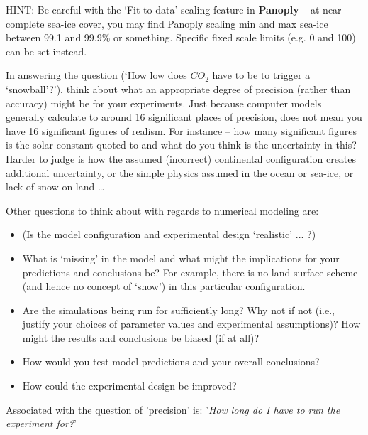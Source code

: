 HINT: Be careful with the ‘\textsf{\footnotesize Fit to data}’ scaling feature in \textbf{Panoply} – at near complete sea-ice cover, you may find Panoply scaling min and max sea-ice between 99.1 and 99.9\% or something. Specific fixed scale limits (e.g. 0 and 100) can be set instead.

In answering the question (‘How low does \(CO_{2}\) have to be to trigger a ‘snowball’?’), think about what an appropriate degree of precision (rather than accuracy) might be for your experiments. Just because computer models generally calculate to around 16 significant places of precision, does not mean you have 16 significant figures of realism. For instance – how many significant figures is the solar constant quoted to and what do you think is the uncertainty in this? Harder to judge is how the assumed (incorrect) continental configuration creates additional uncertainty, or the simple physics assumed in the ocean or sea-ice, or lack of snow on land …

\vspace{1mm}
Other questions to think about with regards to numerical modeling are:

\begin{itemize}[noitemsep]
\setlength{\itemindent}{.2in}
\vspace{1mm}
\item  (Is the model configuration and experimental design ‘realistic’ ... ?)
\vspace{1mm}
\item  What is ‘missing’ in the model and what might the implications for your predictions and conclusions be? For example, there is no land-surface scheme (and hence no concept of ‘snow’) in this particular configuration.
\vspace{1mm}
\item Are the simulations being run for sufficiently long? Why not if not (i.e., justify your choices of parameter values and experimental assumptions)? How might the results and conclusions be biased (if at all)?
\vspace{1mm}
\item How would you test model predictions and your overall conclusions?
\vspace{1mm}
\item How could the experimental design be improved?
\end{itemize}

\vspace{1mm}
\noindent Associated with the question of 'precision' is: '\textit{How long do I have to run the experiment for?}'

